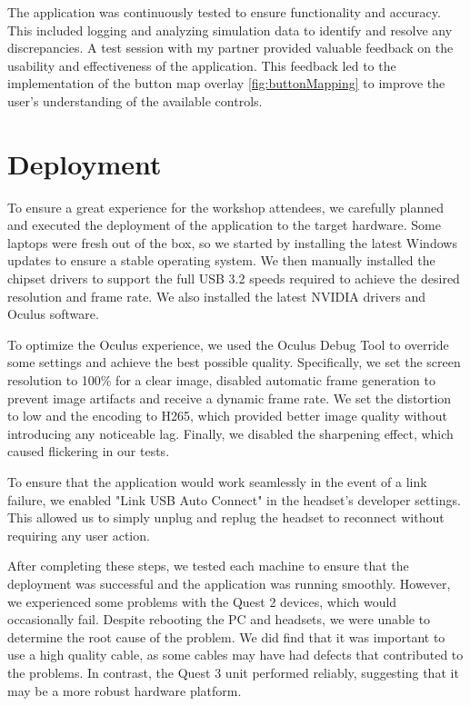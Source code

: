\documentclass[draft, final]{vutinfth} %
\begin{document}
The application was continuously tested to ensure functionality and accuracy.  This included logging and analyzing simulation data to identify and resolve any discrepancies. A test session with my partner provided valuable feedback on the usability and effectiveness of the application. This feedback led to the implementation of the button map overlay \ref{fig:buttonMapping} to improve the user's understanding of the available controls.


\section{Deployment}

To ensure a great experience for the workshop attendees, we carefully planned and executed the deployment of the application to the target hardware. Some laptops were fresh out of the box, so we started by installing the latest Windows updates to ensure a stable operating system. We then manually installed the chipset drivers to support the full USB 3.2 speeds required to achieve the desired resolution and frame rate. We also installed the latest NVIDIA drivers and Oculus software.

To optimize the Oculus experience, we used the Oculus Debug Tool to override some settings and achieve the best possible quality. Specifically, we set the screen resolution to 100\% for a clear image, disabled automatic frame generation to prevent image artifacts and receive a dynamic frame rate. We set the distortion to low and the encoding to H265, which provided better image quality without introducing any noticeable lag. Finally, we disabled the sharpening effect, which caused flickering in our tests.

To ensure that the application would work seamlessly in the event of a link failure, we enabled "Link USB Auto Connect" in the headset's developer settings. This allowed us to simply unplug and replug the headset to reconnect without requiring any user action.

After completing these steps, we tested each machine to ensure that the deployment was successful and the application was running smoothly. However, we experienced some problems with the Quest 2 devices, which would occasionally fail. Despite rebooting the PC and headsets, we were unable to determine the root cause of the problem. We did find that it was important to use a high quality cable, as some cables may have had defects that contributed to the problems. In contrast, the Quest 3 unit performed reliably, suggesting that it may be a more robust hardware platform.
\end{document}

